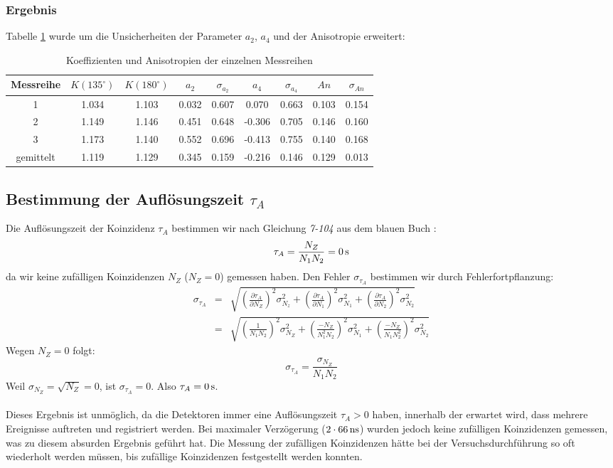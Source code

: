 \documentclass[a4paper,titlepage]{scrartcl}
\numberwithin{equation}{section}
\begin{document}
\subsubsection{Ergebnis}
Tabelle \ref{tab:auswertungMethode2} wurde um die Unsicherheiten der Parameter $a_2$, $a_4$ und der Anisotropie erweitert:
\begin{table}[H]
\centering
\begin{tabular}{c|c|c|c|c|c|c|c|c}
Messreihe & $K(135^{\circ})$ & $K(180^{\circ})$ & $a_2$ & $\sigma_{a_2}$ & $a_4$ & $\sigma_{a_4}$ & $An$ & $\sigma_{An}$ \\
\hline
1 & 1.034 & 1.103 & 0.032 & 0.607 & 0.070 & 0.663 & 0.103 & 0.154\\
2 & 1.149 & 1.146 & 0.451 & 0.648 & -0.306 & 0.705 & 0.146 & 0.160\\
3 & 1.173 & 1.140 & 0.552 & 0.696 & -0.413 & 0.755 & 0.140 & 0.168\\
\hline
gemittelt & 1.119 & 1.129 & 0.345 & 0.159 & -0.216 & 0.146 & 0.129 & 0.013\\
\end{tabular}
\caption{Koeffizienten und Anisotropien der einzelnen Messreihen}
\label{tab:auswertungMethode2}
\end{table}
\subsection{Bestimmung der Auflösungszeit $\tau_A$}
Die Auflösungszeit der Koinzidenz $\tau_A$ bestimmen wir nach Gleichung \emph{7-104} aus dem blauen Buch \cite{blauesBuch}:
\begin{equation*}
\tau_A=\frac{N_Z}{N_1 N_2}=\unit[0]{s}
\end{equation*}
da wir keine zufälligen Koinzidenzen $N_Z$ ($N_Z=0$) gemessen haben.
Den Fehler $\sigma_{\tau_A}$ bestimmen wir durch Fehlerfortpflanzung:
\begin{eqnarray*}
\sigma_{\tau_A}&=&\sqrt{\left( \frac{\partial \tau_A}{\partial N_Z} \right)^2 \sigma^2_{N_z} + \left( \frac{\partial \tau_A}{\partial N_1} \right)^2 \sigma^2_{N_1} + \left( \frac{\partial \tau_A}{\partial N_2} \right)^2 \sigma^2_{N_2}}\\
&=&\sqrt{\left(\frac{1}{N_1 N_2}\right)^2 \sigma^2_{N_Z}+\left(\frac{-N_Z}{N_1^2 N_2}\right)^2 \sigma_{N_1}^2+\left(\frac{-N_Z}{N_1 N_2^2}\right)^2 \sigma_{N_2}^2}
\end{eqnarray*}
Wegen $N_Z=0$ folgt:
\begin{equation*}
\sigma_{\tau_A}=\frac{\sigma_{N_Z}}{N_1 N_2}
\end{equation*}
Weil $\sigma_{N_Z}=\sqrt{N_Z}=0$, ist $\sigma_{\tau_A}=0$. Also $\tau_A=\unit[0]{s}$.\\ \\
Dieses Ergebnis ist unmöglich, da die Detektoren immer eine Auflösungszeit $\tau_A > 0$ haben, innerhalb der erwartet wird, dass mehrere Ereignisse auftreten und registriert werden. Bei maximaler Verzögerung ($2 \cdot \unit[66]{ns}$) wurden jedoch keine zufälligen Koinzidenzen gemessen, was zu diesem absurden Ergebnis geführt hat. Die Messung der zufälligen Koinzidenzen hätte bei der Versuchsdurchführung so oft wiederholt werden müssen, bis zufällige Koinzidenzen festgestellt werden konnten.
\end{document}
